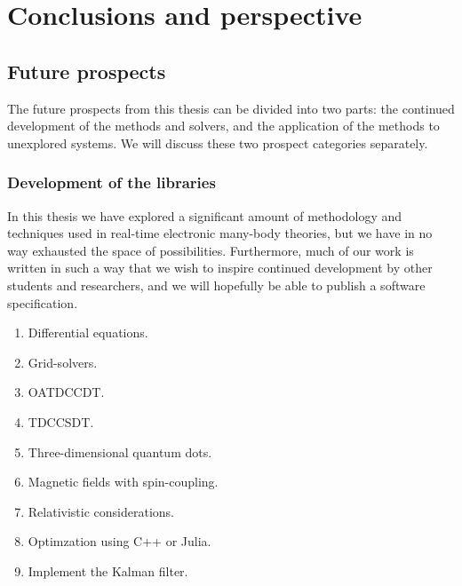 \chapter{Conclusions and perspective}

    \section{Future prospects}
        \label{sec:future-work}
        The future prospects from this thesis can be divided into two parts: the
        continued development of the methods and solvers, and the application of
        the methods to unexplored systems.
        We will discuss these two prospect categories separately.

        \subsection{Development of the libraries}
            In this thesis we have explored a significant amount of methodology
            and techniques used in real-time electronic many-body theories, but
            we have in no way exhausted the space of possibilities.
            Furthermore, much of our work is written in such a way that we wish
            to inspire continued development by other students and researchers,
            and we will hopefully be able to publish a software specification.

            \begin{enumerate}
                \item Differential equations.
                \item Grid-solvers.
                \item OATDCCDT.
                \item TDCCSDT.
                \item Three-dimensional quantum dots.
                \item Magnetic fields with spin-coupling.
                \item Relativistic considerations.
                \item Optimzation using C++ or Julia.
                \item Implement the Kalman filter.
            \end{enumerate}

